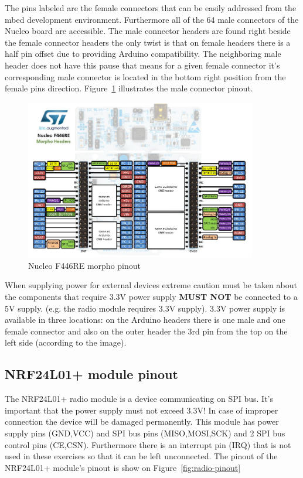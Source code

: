\documentclass[a4paper]{article}
\begin{document}
The pins labeled are the female connectors that can be easily addressed from the mbed development environment.
Furthermore all of the 64 male connectors of the Nucleo board are accessible. The male connector headers are found
right
beside the female connector headers the only twist is that on female headers there is a half pin offset due
to providing Arduino compatibility. The neighboring male header does not have this pause that means for a given female
connector it's corresponding male connector is located in the bottom right position from the female pins direction.
Figure~\ref{fig:nucleo-pinout-morpho} illustrates the male connector pinout.

\begin{figure}[H]
    \centering
    \includegraphics[width=0.9\textwidth]{figures/nucleo-morpho-pinout.png}
    \caption{Nucleo F446RE morpho pinout}
    \label{fig:nucleo-pinout-morpho}
\end{figure}

When supplying power for external devices extreme caution must be taken about the components that require 3.3V power
supply \textbf{MUST NOT} be connected to a 5V supply. (e.g. the radio module requires 3.3V supply).
3.3V power supply is available in three locations: on the Arduino headers there is one male and one female connector
and also on the outer header the 3rd pin from the top on the left side (according to the image).

\subsection{NRF24L01+ module pinout}

The NRF24L01+ radio module is a device communicating on SPI bus. It's important that the power supply must not exceed
3.3V!
In case of improper connection the device will be damaged permanently.
This module has power supply pins (GND,VCC) and SPI bus pins (MISO,MOSI,SCK) and 2 SPI bus control pins (CE,CSN).
Furthermore there is an interrupt pin (IRQ) that is not used in these exercises so that it can be left unconnected.
The pinout of the NRF24L01+ module's pinout is show on Figure~\ref{fig:radio-pinout}
\end{document}
